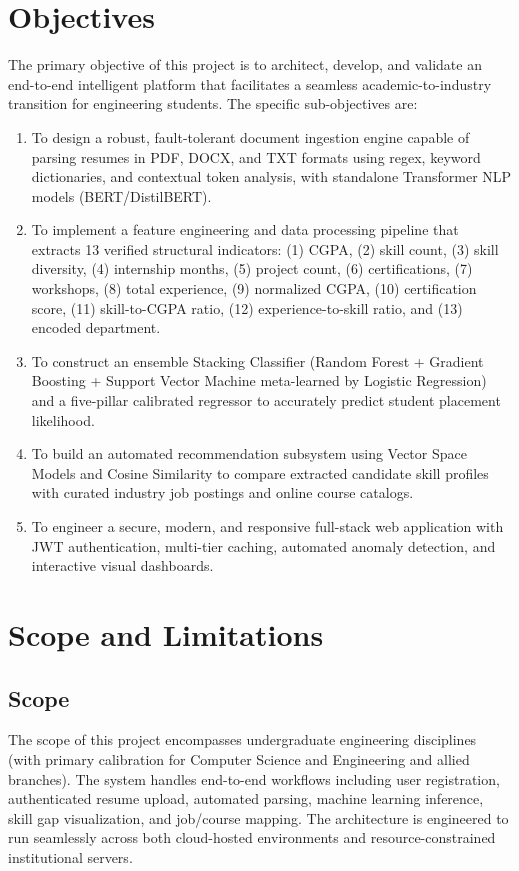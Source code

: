 \documentclass[12pt,a4paper]{report}
\begin{document}
\section{Objectives}
The primary objective of this project is to architect, develop, and validate an end-to-end intelligent platform that facilitates a seamless academic-to-industry transition for engineering students. The specific sub-objectives are:
\begin{enumerate}
    \item To design a robust, fault-tolerant document ingestion engine capable of parsing resumes in PDF, DOCX, and TXT formats using regex, keyword dictionaries, and contextual token analysis, with standalone Transformer NLP models (BERT/DistilBERT).
    \item To implement a feature engineering and data processing pipeline that extracts 13 verified structural indicators: (1) CGPA, (2) skill count, (3) skill diversity, (4) internship months, (5) project count, (6) certifications, (7) workshops, (8) total experience, (9) normalized CGPA, (10) certification score, (11) skill-to-CGPA ratio, (12) experience-to-skill ratio, and (13) encoded department.
    \item To construct an ensemble Stacking Classifier (Random Forest + Gradient Boosting + Support Vector Machine meta-learned by Logistic Regression) and a five-pillar calibrated regressor to accurately predict student placement likelihood.
    \item To build an automated recommendation subsystem using Vector Space Models and Cosine Similarity to compare extracted candidate skill profiles with curated industry job postings and online course catalogs.
    \item To engineer a secure, modern, and responsive full-stack web application with JWT authentication, multi-tier caching, automated anomaly detection, and interactive visual dashboards.
\end{enumerate}

\section{Scope and Limitations}
\subsection{Scope}
The scope of this project encompasses undergraduate engineering disciplines (with primary calibration for Computer Science and Engineering and allied branches). The system handles end-to-end workflows including user registration, authenticated resume upload, automated parsing, machine learning inference, skill gap visualization, and job/course mapping. The architecture is engineered to run seamlessly across both cloud-hosted environments and resource-constrained institutional servers.
\end{document}
